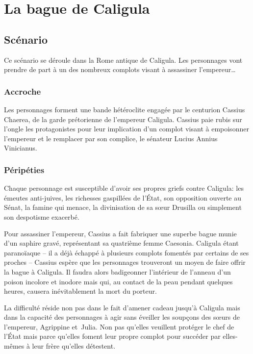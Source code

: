 \chapter{La bague de Caligula}

\section{Scénario}

Ce scénario se déroule dans la Rome antique de Caligula.
Les personnages vont prendre de part à un des nombreux complots visant à assassiner l'empereur\dots

\subsection{Accroche}

Les personnages forment une bande hétéroclite engagée par le centurion Cassius Chaerea, de la garde prétorienne de l'empereur Caligula.
Cassius paie rubis sur l'ongle les protagonistes pour leur implication d'un complot visant à empoisonner l'empereur et le remplacer par son complice, le sénateur Lucius Annius Vinicianus.

\subsection{Péripéties}

Chaque personnage est susceptible d'avoir ses propres griefs contre Caligula: les émeutes anti-juives, les richesses gaspillées de l'État, son opposition ouverte au Sénat, la famine qui menace, la divinisation de sa sœur Drusilla ou simplement son despotisme exacerbé.

Pour assassiner l'empereur, Cassius a fait fabriquer une superbe bague munie d'un saphire gravé, représentant sa quatrième femme Caesonia.
Caligula étant paranoïaque -- il a déjà échappé à plusieurs complots fomentés par certains de ses proches -- Cassius espère que les personnages trouveront un moyen de faire offrir la bague à Caligula.
Il faudra alors badigeonner l'intérieur de l'anneau d'un poison incolore et inodore mais qui, au contact de la peau pendant quelques heures, causera inévitablement la mort du porteur.

La difficulté réside non pas dans le fait d'amener cadeau jusqu'à Caligula mais dans la capacité des personnages à agir sans éveiller les soupçons des sœurs de l'empereur, Agrippine et Julia.
Non pas qu'elles veuillent protéger le chef de l'État mais parce qu'elles foment leur propre complot pour succéder par elles-mêmes à leur frère qu'elles détestent.

